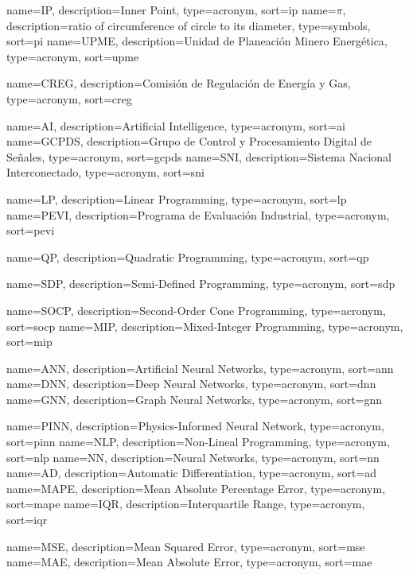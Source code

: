 

{
  name={IP},
  description={Inner Point},
  type=acronym,
  sort={ip}
}
{
  name={\ensuremath{\pi}},
  description={ratio of circumference of circle to its
               diameter},
  type=symbols,
  sort={pi}
}
{
  name={UPME},
  description={Unidad de Planeación Minero Energética},
  type=acronym,
  sort={upme}
}

{
  name={CREG},
  description={Comisión de Regulación de Energía y Gas},
  type=acronym,
  sort={creg}
}

{
  name={AI},
  description={Artificial Intelligence},
  type=acronym,
  sort={ai}
}
{
  name={GCPDS},
  description={Grupo de Control  y Procesamiento Digital de Señales},
  type=acronym,
  sort={gcpds}
}
{
  name={SNI},
  description={Sistema Nacional Interconectado},
  type=acronym,
  sort={sni}
}

{
  name={LP},
  description={Linear Programming},
  type=acronym,
  sort={lp}
}
{
  name={PEVI},
  description={Programa de Evaluación Industrial},
  type=acronym,
  sort={pevi}
}

{
  name={QP},
  description={Quadratic Programming},
  type=acronym,
  sort={qp}
}

{
  name={SDP},
  description={Semi-Defined Programming},
  type=acronym,
  sort={sdp}
}


{
  name={SOCP},
  description={Second-Order Cone Programming},
  type=acronym,
  sort={socp}
}
{
  name={MIP},
  description={Mixed-Integer Programming},
  type=acronym,
  sort={mip}
}

{
  name={ANN},
  description={Artificial Neural Networks},
  type=acronym,
  sort={ann}
}
{
  name={DNN},
  description={Deep Neural Networks},
  type=acronym,
  sort={dnn}
}
{
  name={GNN},
  description={Graph Neural Networks},
  type=acronym,
  sort={gnn}
}

{
  name={PINN},
  description={Physics-Informed Neural Network},
  type=acronym,
  sort={pinn}
}
{
  name={NLP},
  description={Non-Lineal Programming},
  type=acronym,
  sort={nlp}
}
{
  name={NN},
  description={Neural Networks},
  type=acronym,
  sort={nn}
}
{
  name={AD},
  description={Automatic Differentiation},
  type=acronym,
  sort={ad}
}
{
  name={MAPE},
  description={Mean Absolute Percentage Error},
  type=acronym,
  sort={mape}
}
{
  name={IQR},
  description={Interquartile Range},
  type=acronym,
  sort={iqr}
}

{
  name={MSE},
  description={Mean Squared Error},
  type=acronym,
  sort={mse}
}
{
  name={MAE},
  description={Mean Absolute Error},
  type=acronym,
  sort={mae}
}
